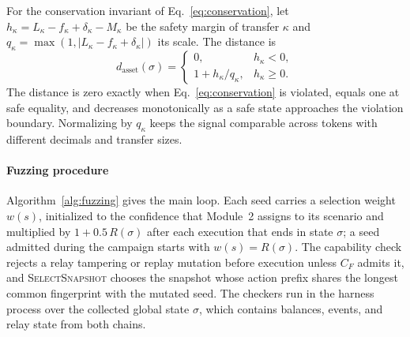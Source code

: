 \documentclass[a4paper]{cas-sc}
\begin{document}
For the conservation invariant of Eq.~\eqref{eq:conservation}, let $h_{\kappa} = L_{\kappa} - f_{\kappa} + \delta_{\kappa} - M_{\kappa}$ be the safety margin of transfer $\kappa$ and $q_{\kappa} = \max(1, |L_{\kappa} - f_{\kappa} + \delta_{\kappa}|)$ its scale. The distance is
\begin{equation}\label{eq:distance}
 d_{\text{asset}}(\sigma) =
 \begin{cases}
  0, & h_{\kappa} < 0,\\[2pt]
  1 + h_{\kappa}/q_{\kappa}, & h_{\kappa} \geq 0.
 \end{cases}
\end{equation}
The distance is zero exactly when Eq.~\eqref{eq:conservation} is violated, equals one at safe equality, and decreases monotonically as a safe state approaches the violation boundary. Normalizing by $q_{\kappa}$ keeps the signal comparable across tokens with different decimals and transfer sizes.

\paragraph{Fuzzing procedure}
Algorithm~\ref{alg:fuzzing} gives the main loop. Each seed carries a selection weight $w(s)$, initialized to the confidence that Module~2 assigns to its scenario and multiplied by $1 + 0.5\,R(\sigma)$ after each execution that ends in state $\sigma$; a seed admitted during the campaign starts with $w(s) = R(\sigma)$. The capability check rejects a relay tampering or replay mutation before execution unless $C_F$ admits it, and \textsc{SelectSnapshot} chooses the snapshot whose action prefix shares the longest common fingerprint with the mutated seed. The checkers run in the harness process over the collected global state $\sigma$, which contains balances, events, and relay state from both chains.
\end{document}
